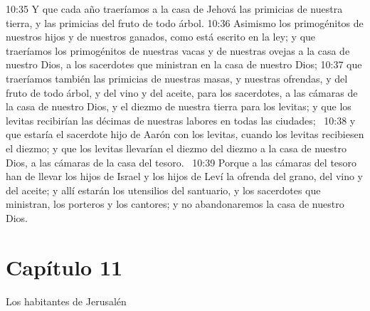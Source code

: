 10:35 Y que cada año traeríamos a la casa de Jehová las primicias de nuestra tierra, y las primicias del fruto de todo árbol. 
10:36 Asimismo los primogénitos de nuestros hijos y de nuestros ganados, como está escrito en la ley; y que traeríamos los primogénitos de nuestras vacas y de nuestras ovejas a la casa de nuestro Dios, a los sacerdotes que ministran en la casa de nuestro Dios; 
10:37 que traeríamos también las primicias de nuestras masas, y nuestras ofrendas, y del fruto de todo árbol, y del vino y del aceite, para los sacerdotes, a las cámaras de la casa de nuestro Dios, y el diezmo de nuestra tierra para los levitas; y que los levitas recibirían las décimas de nuestras labores en todas las ciudades;  
10:38 y que estaría el sacerdote hijo de Aarón con los levitas, cuando los levitas recibiesen el diezmo; y que los levitas llevarían el diezmo del diezmo a la casa de nuestro Dios, a las cámaras de la casa del tesoro.  
10:39 Porque a las cámaras del tesoro han de llevar los hijos de Israel y los hijos de Leví la ofrenda del grano, del vino y del aceite; y allí estarán los utensilios del santuario, y los sacerdotes que ministran, los porteros y los cantores; y no abandonaremos la casa de nuestro Dios.  
\section*{Capítulo 11}
Los habitantes de Jerusalén  

